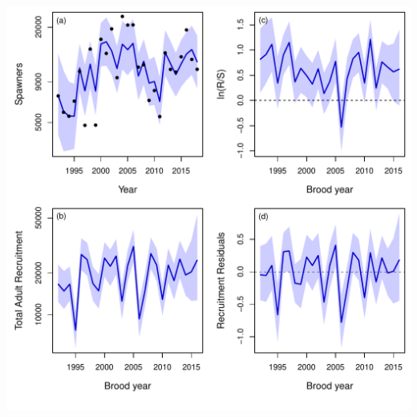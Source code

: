 \documentclass[
  11pt,
]{article}
\begin{document}
\includegraphics{App_2_Summarize_results_Summer_Fall_Chinook_files/figure-latex/plot_escapement_Recruitment_Innovations-1.pdf}
\end{document}
